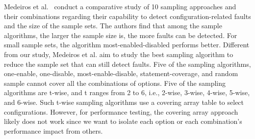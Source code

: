 Medeiros et al.~\cite{DBLP:conf/icse/MedeirosKRGA16} conduct a comparative study of 10 sampling approaches and their combinations regarding their capability to detect configuration-related faults and the size of the sample sets. The authors find that among the sample algorithms, the larger the sample size is, the more faults can be detected. For small sample sets, the algorithm most-enabled-disabled performs better. Different from our study, Medeiros et al. aim to study the best sampling algorithm to reduce the sample set that can still detect faults.  Five of the sampling algorithms, one-enable, one-disable, most-enable-disable, statement-coverage, and random sample cannot cover all the combinations of options. Five of the sampling algorithms are t-wise, and t ranges from 2 to 6, i.e., 2-wise, 3-wise, 4-wise, 5-wise, and 6-wise. Such t-wise sampling algorithms use a covering array table to select configurations. However, for performance testing, the covering array approach likely does not work since we want to isolate each option or each combination's performance impact from others.

